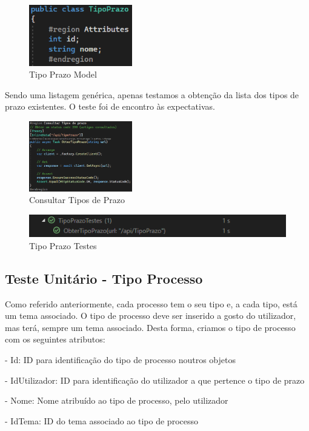 \begin{figure}[!h]
\centering
\includegraphics[width=0.4\textwidth]{Figuras/Models/TipoPrazoModel.png}
\caption{Tipo Prazo Model}
\label{d.model}
\end{figure}

\indent \par Sendo uma listagem genérica, apenas testamos a obtenção da lista dos tipos de prazo existentes. O teste foi de encontro às expectativas.

\begin{figure}[!h]
\centering
\includegraphics[width=0.4\textwidth]{Figuras/TestesUnitarios/TipoPrazo/Consultar Tipos de prazo.png}
\caption{Consultar Tipos de Prazo}
\label{d.unitario}
\end{figure}

\begin{figure}[!h]
\centering
\includegraphics[width=1\textwidth]{Figuras/Testes/TipoPrazoTestes.png}
\caption{Tipo Prazo Testes}
\label{d.teste}
\end{figure}


\subsection{Teste Unitário - Tipo Processo}
\indent \par Como referido anteriormente, cada processo tem o seu tipo e, a cada tipo, está um tema associado. O tipo de processo deve ser inserido a gosto do utilizador, mas terá, sempre um tema associado. Desta forma, criamos o tipo de processo com os seguintes atributos:
\indent \par - Id: ID para identificação do tipo de processo noutros objetos
\indent \par - IdUtilizador: ID para identificação do utilizador a que pertence o tipo de prazo
\indent \par - Nome: Nome atribuído ao tipo de processo, pelo utilizador
\indent \par - IdTema: ID do tema associado ao tipo de processo

